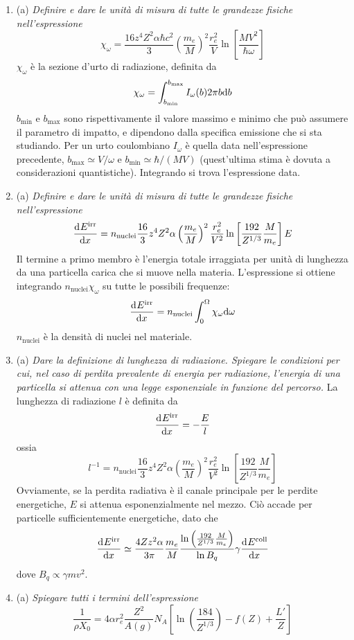 \documentclass{article}
\renewcommand{\a}{(a)}
\renewcommand{\t}[1]{\textit{ #1}}
\begin{document}
\begin{enumerate}
	\item\a\t{Definire e dare le unità di misura di tutte le grandezze fisiche nell'espressione
		\[\chi_\omega = \frac{16z^4
		Z^2\alpha\hbar c^2}{3}\left(\frac{m_e}{M}\right)^2\frac{r_e^2}{V}\ln\left[\frac{MV^2}{\hbar\omega}\right]\]}
	$\chi_\omega$ è la sezione d'urto di radiazione, definita da
	\[\chi_\omega=\int_{b_\textrm{min}}^{b_\textrm{max}}I_\omega(b)2\pi b\mathrm{d} b\]
	$b_\textrm{min}$ e $b_\textrm{max}$ sono rispettivamente il valore massimo e minimo che può assumere il parametro di impatto, e dipendono dalla specifica emissione che si sta studiando. Per un urto coulombiano $I_\omega$ è quella data nell'espressione precedente, $b_\textrm{max}\simeq V/\omega$ e $b_\textrm{min}\simeq\hbar/(MV)$ (quest'ultima stima è dovuta a considerazioni quantistiche). Integrando si trova l'espressione data.
	\item\a\t{Definire e dare le unità di misura di tutte le grandezze fisiche nell'espressione
		\[\dfrac{\mathrm{d} ^{}E^\mathrm{irr}}{\mathrm{d} {x}^{}}= n_\mathrm{nuclei}\frac{16}{3}z^4Z^2\alpha\left(\frac{m_e}{M}\right)^2\frac{r_e^2}{V^2}\ln \left[\frac{192}{Z^{1/3}}\frac{M}{m_e}\right]E\]} Il termine a primo membro è l'energia totale irraggiata per unità di lunghezza da una particella carica che si muove nella materia. L'espressione si ottiene integrando $n_\textrm{nuclei}\chi_\omega$ su tutte le possibili frequenze:
		\[\dfrac{\mathrm{d} ^{}E^\textrm{irr}}{\mathrm{d} {x}^{}}=n_\textrm{nuclei}\int_{0}^{\Omega}\chi_\omega\mathrm{d} \omega\]
		$n_\textrm{nuclei}$ è la densità di nuclei nel materiale.
\item\a\t{Dare la definizione di lunghezza di radiazione. Spiegare le condizioni per cui, nel
		caso di perdita prevalente di energia per radiazione, l’energia di una particella si
		attenua con una legge esponenziale in funzione del percorso.}
	La lunghezza di radiazione $l$ è definita da
	\[\dfrac{\mathrm{d} ^{}E^\textrm{irr}}{\mathrm{d} {x}^{}}=-\frac{E}{l}\]
	ossia
	\[l^{-1}=n_\mathrm{nuclei}\frac{16}{3}z^4Z^2\alpha\left(\frac{m_e}{M}\right)^2\frac{r_e^2}{V^2}\ln \left[\frac{192}{Z^{1/3}}\frac{M}{m_e}\right]\]
	Ovviamente, se la perdita radiativa è il canale principale per le perdite energetiche, $E$ si attenua esponenzialmente nel mezzo. Ciò accade per particelle sufficientemente energetiche, dato che
	\[\dfrac{\mathrm{d} ^{}E^\textrm{irr}}{\mathrm{d} {x}^{}}\simeq\frac{4Zz^2\alpha}{3\pi}\frac{m_e}{M}\frac{\ln\left(\frac{192}{Z^{1/3}}\frac{M}{m_e}\right)}{\ln B_q}\gamma\dfrac{\mathrm{d} ^{}E^\textrm{coll}}{\mathrm{d} {x}^{}}\]
	dove $B_q\propto\gamma mv^2$.
	\item\a\t{Spiegare tutti i termini dell'espressione \[\frac{1}{\rho X_0}= 4\alpha r_e^2 \frac{Z^2}{A(g)}N_A \left[\ln\left(\frac{184}{Z^{1/3}}\right)-f(Z)+ \frac{L'}{Z}\right]\]
}
\end{enumerate}
\end{document}
